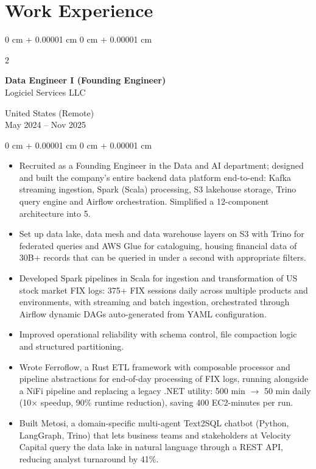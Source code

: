 \documentclass[10pt, letterpaper]{article}
\newenvironment{highlights}{
    \begin{itemize}[
        topsep=0.10 cm,
        parsep=0.10 cm,
        partopsep=0pt,
        itemsep=0pt,
        leftmargin=0 cm + 10pt
    ]
}{
    \end{itemize}
} %
\newenvironment{onecolentry}{
    \begin{adjustwidth}{
        0 cm + 0.00001 cm
    }{
        0 cm + 0.00001 cm
    }
}{
    \end{adjustwidth}
} %
\newenvironment{twocolentry}[2][]{
    \onecolentry
    \def\secondColumn{#2}
    \setcolumnwidth{\fill, 4.5 cm}
    \begin{paracol}{2}
}{
    \switchcolumn \raggedleft \secondColumn
    \end{paracol}
    \endonecolentry
} %
\begin{document}
\section{Work Experience}

\begin{twocolentry}{United States (Remote) \\ May 2024 -- Nov 2025}
    \textbf{Data Engineer I (Founding Engineer)} \\
    Logiciel Services LLC
\end{twocolentry}
\begin{onecolentry}
    \begin{highlights}
        \item Recruited as a Founding Engineer in the Data and AI department; designed and built the company's entire backend data platform end-to-end: Kafka streaming ingestion, Spark (Scala) processing, S3 lakehouse storage, Trino query engine and Airflow orchestration. Simplified a 12-component architecture into 5.
        \item Set up data lake, data mesh and data warehouse layers on S3 with Trino for federated queries and AWS Glue for cataloguing, housing financial data of 30B+ records that can be queried in under a second with appropriate filters.
        \item Developed Spark pipelines in Scala for ingestion and transformation of US stock market FIX logs: 375+ FIX sessions daily across multiple products and environments, with streaming and batch ingestion, orchestrated through Airflow dynamic DAGs auto-generated from YAML configuration.
        \item Improved operational reliability with schema control, file compaction logic and structured partitioning.
        \item Wrote Ferroflow, a Rust ETL framework with composable processor and pipeline abstractions for end-of-day processing of FIX logs, running alongside a NiFi pipeline and replacing a legacy .NET utility: 500 min $\rightarrow$ 50 min daily (10$\times$ speedup, 90\% runtime reduction), saving 400 EC2-minutes per run.
        \item Built Metosi, a domain-specific multi-agent Text2SQL chatbot (Python, LangGraph, Trino) that lets business teams and stakeholders at Velocity Capital query the data lake in natural language through a REST API, reducing analyst turnaround by 41\%.
    \end{highlights}
\end{onecolentry}
\end{document}
